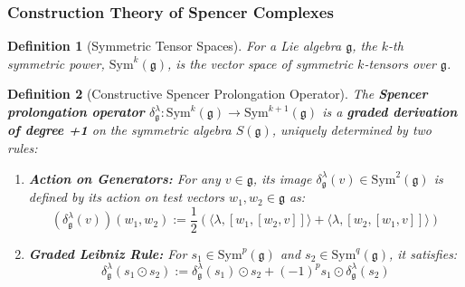 \documentclass[a4paper,12pt]{extarticle}
\theoremstyle{plain}
\newtheorem{theorem}{Theorem}[section]
\newtheorem{definition}[theorem]{Definition}
\theoremstyle{definition}
\begin{document}

\subsubsection{Construction Theory of Spencer Complexes}

\begin{definition}[Symmetric Tensor Spaces]
\label{def:symmetric-tensors}
For a Lie algebra $\mathfrak{g}$, the $k$-th symmetric power, $\mathrm{Sym}^k(\mathfrak{g})$, is the vector space of symmetric $k$-tensors over $\mathfrak{g}$.
\end{definition}

\begin{definition}[Constructive Spencer Prolongation Operator]
\label{def:spencer-operator-constructive}
The \textbf{Spencer prolongation operator} $\delta^\lambda_\mathfrak{g}: \mathrm{Sym}^k(\mathfrak{g}) \to \mathrm{Sym}^{k+1}(\mathfrak{g})$ is a \textbf{graded derivation of degree +1} on the symmetric algebra $S(\mathfrak{g})$, uniquely determined by two rules:
\begin{enumerate}
    \item[\textbf{(A)}] \textbf{Action on Generators:} For any $v \in \mathfrak{g}$, its image $\delta^{\lambda}_{\mathfrak{g}}(v) \in \mathrm{Sym}^2(\mathfrak{g})$ is defined by its action on test vectors $w_1, w_2 \in \mathfrak{g}$ as:
    $$(\delta^{\lambda}_{\mathfrak{g}}(v))(w_1, w_2) := \frac{1}{2} \left( \langle\lambda, [w_1, [w_2, v]]\rangle + \langle\lambda, [w_2, [w_1, v]]\rangle \right)$$

    \item[\textbf{(B)}] \textbf{Graded Leibniz Rule:} For $s_1 \in \mathrm{Sym}^p(\mathfrak{g})$ and $s_2 \in \mathrm{Sym}^q(\mathfrak{g})$, it satisfies:
    $$\delta^{\lambda}_{\mathfrak{g}}(s_1 \odot s_2) := \delta^{\lambda}_{\mathfrak{g}}(s_1) \odot s_2 + (-1)^p s_1 \odot \delta^{\lambda}_{\mathfrak{g}}(s_2)$$
\end{enumerate}
\end{definition}
\end{document}
